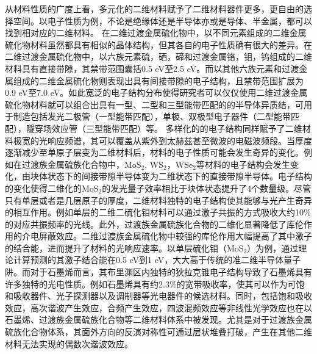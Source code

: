 从材料性质的广度上看，多元化的二维材料赋予了二维材料器件更多，更自由的选择空间。以电子性质为例，不论是绝缘体还是半导体亦或是导体、半金属，都可以找到相对应的二维材料。
在二维过渡金属硫化物中，以不同元素组成的二维金属硫化物材料虽然都具有相似的晶体结构，但其各自的电子性质确有很大的差异。在二维过渡金属硫化物中，以六族元素硫，硒，碲和过渡金属铬，钼，钨组成的二维材料具有直接带隙，其禁带范围囊括0.5 eV至2.5 eV。而以其他六族元素和过渡金属组成的二维金属硫化物则表现出具有间接带隙的电子结构，且禁带范围扩展为0.9 eV至7.0 eV。如此宽泛的电子结构分布使得研究者可以仅仅使用二维过渡金属硫化物材料就可以组合出具有一型、二型和三型能带匹配的的半导体异质结，可用于制造包括发光二极管（一型能带匹配），单极、双极型电子器件（二型能带匹配），隧穿场效应管（三型能带匹配）等。
多样化的的电子结构同样赋予了二维材料极宽的光响应频谱，其可以覆盖从紫外到太赫兹甚至微波的电磁波频段。当厚度逐渐减少至单原子层变为二维材料后，材料的电子性质可能会发生奇异的变化。例如在过渡族金属硫族化合物中，MoS$_2$, WS$_2$，WSe$_2$等材料的电子结构会发生变化，由块体状态下的间接带隙半导体变为二维状态下的直接带隙半导体。电子结构的变化使得二维化的MoS$_2$的发光量子效率相比于块体状态提升了4个数量级。尽管只有单层或者是几层原子的厚度，二维材料独特的电子结构使其能够与光产生奇异的相互作用。例如单层的二维二硫化钼材料可以通过激子共振的方式吸收大约10\%的对应共振频率的光线。此外，过渡族金属硫族化合物的二维化显著降低了库伦作用的介电屏蔽效应。二维过渡族金属硫化物中较强的库伦作用大幅提高了其中激子的结合能，进而提升了材料的光响应速率。以单层硫化钼（MoS$_2$）为例，通过理论计算预测的其激子结合能在0.5 eV到1 eV，大大高于传统的准二维半导体量子阱。而对于石墨烯而言，其布里渊区内独特的狄拉克锥电子结构导致了石墨烯具有许多独特的光电性质。例如石墨烯具有约2.3\%的宽带吸收率，使其可以作为可饱和吸收器件、光子探测器以及调制器等光电器件的候选材料。同时，包括饱和吸收效应，高次谐波产生效应，合频产生效应，四波混频效应等非线性光学效应也在以石墨烯、过渡族金属硫族化合物等二维材料体系中被发现。尤其是对于过渡族金属硫族化合物体系，其面外方向的反演对称性可通过层状堆叠打破，产生在其他二维材料无法实现的偶数次谐波效应。%


